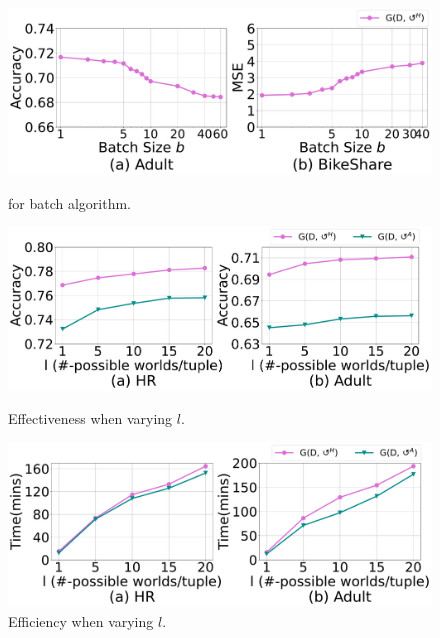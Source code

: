  \begin{figure}   
	\centering
	\begin{minipage}[t]{0.32\textwidth}
		\centering
		\includegraphics[width=\columnwidth]{figs/batchsize}
		\vspace{-2.5em}
		\caption{\ours for batch algorithm.}
		\label{fig:batchalg}
	\end{minipage}
	\begin{minipage}[t]{0.32\textwidth}
		\centering
		\includegraphics[width=\columnwidth]{figs/vary_l_effectiveness}
		\vspace{-2.5em}
		\caption{Effectiveness when varying $l$.}
		\label{fig:vary_l_effect}
	\end{minipage}
	\begin{minipage}[t]{0.32\textwidth}
		\centering
		\includegraphics[width=\columnwidth]{figs/vary_l_efficiency}
		\vspace{-2.5em}
		\caption{Efficiency when varying $l$.}
		\label{fig:vary_l_efficient}
	\end{minipage}
\end{figure}

